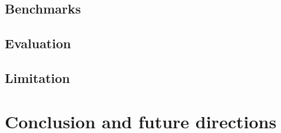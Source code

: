 \documentclass[runningheads,a4paper]{llncs}
\newcounter{la}
\begin{document}
\subsection{Benchmarks }
\subsection{Evaluation}
\subsection{Limitation}

\section{Conclusion and future directions}

 


%
%
%
%
%
%
%
\end{document}
